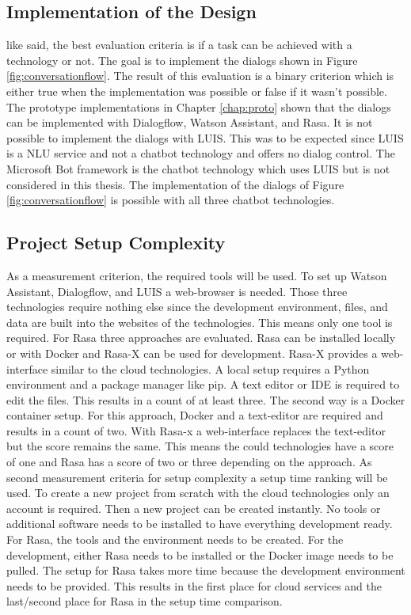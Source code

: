 \subsection*{Implementation of the Design}
like \citet{singhbuilding} said, the best evaluation criteria is if a task can be achieved with a technology or not.
The goal is to implement the dialogs shown in Figure \ref{fig:conversationflow}.
The result of this evaluation is a binary criterion which is either true when the implementation was possible or false
if it wasn't possible.
The prototype implementations in Chapter \ref{chap:proto} shown that the dialogs can be 
implemented with Dialogflow, Watson Assistant, and Rasa.
It is not possible to implement the dialogs with LUIS. 
This was to be expected since LUIS is a NLU service and not a chatbot technology and offers no dialog control.
The Microsoft Bot framework is the chatbot technology which uses LUIS but 
is not considered in this thesis.
The implementation of the dialogs of Figure \ref{fig:conversationflow} is possible with all 
three chatbot technologies.


\subsection*{Project Setup Complexity} \label{sec:setup_complex}
As a measurement criterion, the required tools will be used.
To set up Watson Assistant, Dialogflow, and LUIS a web-browser is needed.
Those three technologies require nothing else since the development environment,
files, and data are built into the websites of the technologies.
This means only one tool is required.
For Rasa three approaches are evaluated.
Rasa can be installed locally or with Docker and Rasa-X can be used for development.
Rasa-X provides a web-interface similar to the cloud technologies.
A local setup requires a Python environment and a package manager like pip.
A text editor or IDE is required to edit the files.
This results in a count of at least three.
The second way is a Docker container setup.
For this approach, Docker and a text-editor are required and results in a count of two.
With Rasa-x a web-interface replaces the text-editor but the score remains the same.
This means the could technologies have a score of one and Rasa has a score of two or three
depending on the approach.
As second measurement criteria for setup complexity a setup time ranking will be used.
To create a new project from scratch with the cloud technologies only an account is required.
Then a new project can be created instantly.
No tools or additional software needs to be installed to have everything development ready.
For Rasa, the tools and the environment needs to be created.
For the development, either Rasa needs to be installed or the Docker image needs to be pulled.
The setup for Rasa takes more time because the development environment needs to be provided.
This results in the first place for cloud services and the last/second place for Rasa in the
setup time comparison. 

